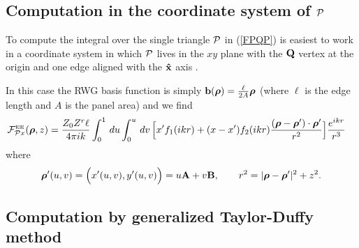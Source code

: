 \documentclass[letterpaper]{article}
\begin{document}
\subsection*{Computation in the coordinate system of $\mathcal{P}$}

To compute the integral over the single triangle $\mathcal{P}$ in (\ref{FPQP})
is easiest to work in a coordinate system in which $\mathcal{P}$
lives in the $xy$ plane with the $\mathbf{Q}$ vertex at the origin and 
one edge aligned with the $\mathbf{\hat x}$ axis
.

In this case the RWG basis function is simply 
$\mathbf{b}(\boldsymbol{\rho})=\frac{\ell}{2A}\boldsymbol{\rho}$
(where $\ell$ is the edge length and $A$ is the panel area) and we find
\begin{align*}
 \mathcal{F}^{\hbox{\tiny{EE}}}_{\mathcal{P} x}(\boldsymbol{\rho}, z)
&=\frac{Z_0 Z^r \ell }{4\pi ik } \int_0^1 \, du \int_0^u \, dv \,
  \Big[ x^\prime f_1(ikr) +
        (x-x^\prime) 
        f_2(ikr) 
        \frac{ (\boldsymbol{\rho}-\boldsymbol{\rho}^\prime)\cdot \boldsymbol{\rho}^\prime }
             { r^2 }
  \Big] \frac{e^{ikr}}{r^3}
\end{align*}
where 
$$ \boldsymbol{\rho}^\prime(u,v)=\Big(x^\prime(u,v), y^\prime(u,v)\Big) 
   = u\mathbf{A} + v\mathbf{B},
   \qquad r^2=|\boldsymbol{\rho}-\boldsymbol{\rho}^\prime|^2 + z^2.
$$
\subsection*{Computation by generalized Taylor-Duffy method}
\end{document}
